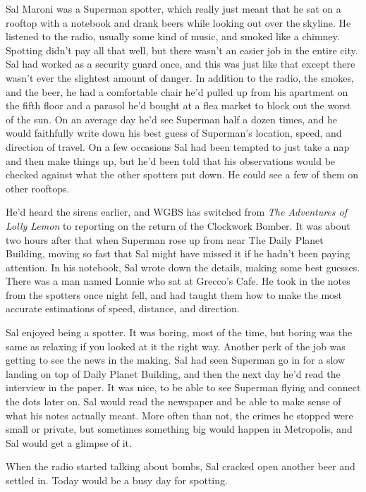 \documentclass[ebook,12pt]{memoir}
\begin{document}
Sal Maroni was a Superman spotter, which really just meant that he sat
on a rooftop with a notebook and drank beers while looking out over the
skyline. He listened to the radio, usually some kind of music, and
smoked like a chimney. Spotting didn't pay all that well, but there
wasn't an easier job in the entire city. Sal had worked as a security
guard once, and this was just like that except there wasn't ever the
slightest amount of danger. In addition to the radio, the smokes, and
the beer, he had a comfortable chair he'd pulled up from his apartment
on the fifth floor and a parasol he'd bought at a flea market to block
out the worst of the sun. On an average day he'd see Superman half a
dozen times, and he would faithfully write down his best guess of
Superman's location, speed, and direction of travel. On a few occasions
Sal had been tempted to just take a nap and then make things up, but
he'd been told that his observations would be checked against what the
other spotters put down. He could see a few of them on other rooftops.

He'd heard the sirens earlier, and WGBS has switched from \emph{The
Adventures of Lolly Lemon} to reporting on the return of the Clockwork
Bomber. It was about two hours after that when Superman rose up from
near The Daily Planet Building, moving so fast that Sal might have
missed it if he hadn't been paying attention. In his notebook, Sal wrote
down the details, making some best guesses. There was a man named Lonnie
who sat at Grecco's Cafe. He took in the notes from the spotters once
night fell, and had taught them how to make the most accurate
estimations of speed, distance, and direction.

Sal enjoyed being a spotter. It was boring, most of the time, but boring
was the same as relaxing if you looked at it the right way. Another perk
of the job was getting to see the news in the making. Sal had seen
Superman go in for a slow landing on top of Daily Planet Building, and
then the next day he'd read the interview in the paper. It was nice, to
be able to see Superman flying and connect the dots later on. Sal would
read the newspaper and be able to make sense of what his notes actually
meant. More often than not, the crimes he stopped were small or private,
but sometimes something big would happen in Metropolis, and Sal would
get a glimpse of it.

When the radio started talking about bombs, Sal cracked open another
beer and settled in. Today would be a busy day for spotting.
\end{document}
